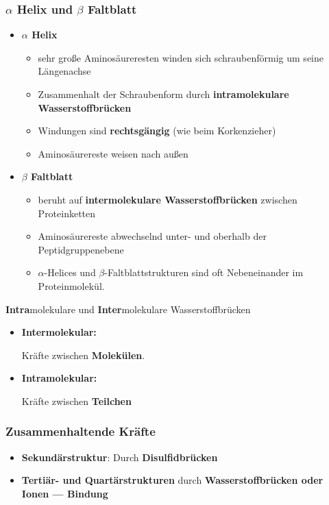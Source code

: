 \documentclass[a4paper, 12pt]{scrartcl}
\begin{document}
\subsubsection{$\alpha$ Helix und $\beta$ Faltblatt}
\begin{itemize}
    \item \textbf{$\alpha$ Helix}

        \begin{itemize}
            \item sehr große Aminosäureresten winden sich schraubenförmig um
                seine Längenachse
            \item Zusammenhalt der Schraubenform durch \textbf{intramolekulare Wasserstoffbrücken}
            \item Windungen sind \textbf{rechtsgängig} (wie beim Korkenzieher)
            \item Aminosäurereste weisen nach außen
        \end{itemize}

    \item \textbf{$\beta$ Faltblatt}

        \begin{itemize}
            \item beruht auf \textbf{intermolekulare Wasserstoffbrücken}
                zwischen Proteinketten
            \item Aminosäurereste abwechselnd unter- und oberhalb der
                Peptidgruppenebene
            \item $\alpha$-Helices und $\beta$-Faltblattstrukturen sind oft
                Nebeneinander im Proteinmolekül.
        \end{itemize}
\end{itemize}
\begin{merke}{\textbf{Intra}molekulare und \textbf{Inter}molekulare
        Wasserstoffbrücken}
    \begin{itemize}
        \item \textbf{Intermolekular:}

            Kräfte zwischen \textbf{Molekülen}.
        \item \textbf{Intramolekular:}

            Kräfte zwischen \textbf{Teilchen}
    \end{itemize}
\end{merke}
\subsubsection{Zusammenhaltende Kräfte}
\begin{itemize}
    \item \textbf{Sekundärstruktur}: Durch \textbf{Disulfidbrücken}
    \item \textbf{Tertiär- und Quartärstrukturen} durch
        \textbf{Wasserstoffbrücken oder Ionen --- Bindung}
\end{itemize}
\end{document}
